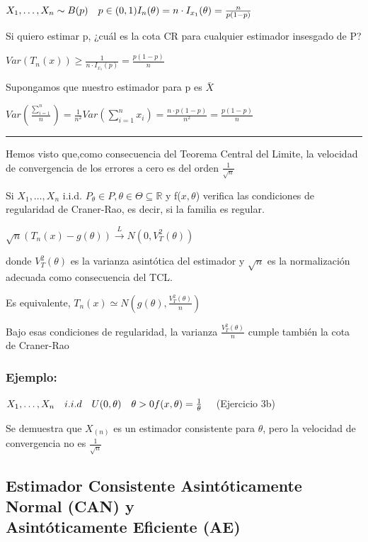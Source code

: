 \(
X_1,\dots,X_n \sim B(p) \quad p \in (0,1)
\\I_n(\theta)=n \cdot I_{x_1}(\theta)=\frac{n}{p(1-p)}
\)

Si quiero estimar p, ¿cuál es la cota CR para cualquier estimador insesgado de P?

\(
Var(T_n(x)) \geq \frac{1}{n \cdot I_{x_1}(p)}=\frac{p(1-p)}{n}
\)

Supongamos que nuestro estimador para p es $\bar{X}$

$Var(\frac{\sum_{i=1}^{n}}{n})=\frac{1}{n^2}Var(\sum_{i=1}^{n} x_i)
    =\frac{n \cdot p(1-p)}{n^2}=\frac{p(1-p)}{n}$

\noindent\rule{\textwidth}{0.5pt} %

Hemos visto que,como consecuencia del Teorema Central del Limite,  la velocidad de convergencia de los errores a cero es del orden $\frac{1}{\sqrt{n}}$

Si $X_1,\dots,X_n$ i.i.d. $P_\theta \in P,\theta \in \Theta \subseteq \mathbb{R}$ y f($x,\theta$)
verifica las condiciones de regularidad de Craner-Rao, es decir, si la familia es regular.

$\sqrt{n}(T_n(x)-g(\theta)) \xrightarrow{L} N(0,V_T^2(\theta))$

donde $V_T^2(\theta)$ es la varianza asintótica del estimador y $\sqrt{n}$ es la normalización
adecuada como consecuencia del TCL.

Es equivalente, $T_n(x) \simeq N(g(\theta),\frac{V_T^2(\theta)}{n})$

Bajo esas condiciones de regularidad, la varianza $\frac{V_T^2(\theta)}{n}$
cumple también la cota de Craner-Rao

\subsubsection*{Ejemplo:}

\(
X_1,\dots,X_n \quad i.i.d \quad U(0,\theta) \quad \theta>0
\\f(x,\theta)= \frac{1}{\theta} \quad
\)
(Ejercicio 3b)

Se demuestra que $X_{(n)}$ es un estimador consistente para $\theta$, pero la velocidad de convergencia no es $\frac{1}{\sqrt{n}}$

\subsection{Estimador Consistente Asintóticamente Normal (CAN) y \texorpdfstring{\\}{ } Asintóticamente Eficiente (AE)}

